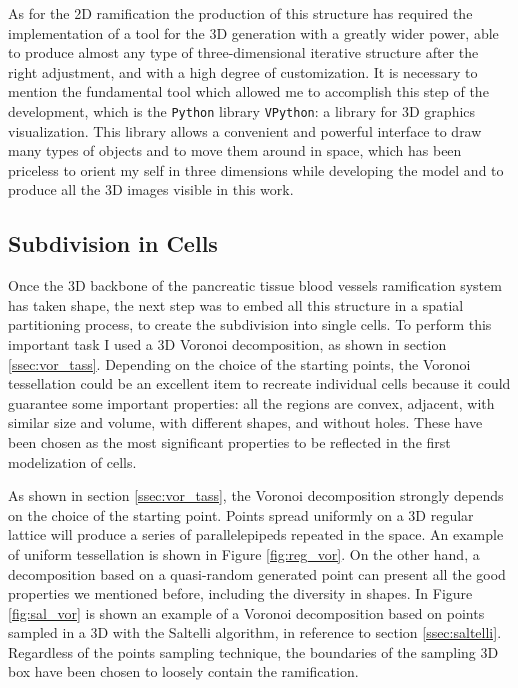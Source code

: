 \documentclass[12pt,a4paper]{report}
\begin{document}
    As for the 2D ramification the production of this structure has required the implementation of a tool for the 3D generation with a greatly wider power, able to produce almost any type of three-dimensional iterative structure after the right adjustment, and with a high degree of customization. It is necessary to mention the fundamental tool which allowed me to accomplish this step of the development, which is the \texttt{Python} library \texttt{VPython}: a library for 3D graphics visualization. This library allows a convenient and powerful interface to draw many types of objects and to move them around in space, which has been priceless to orient my self in three dimensions while developing the model and to produce all the 3D images visible in this work.

\subsection{Subdivision in Cells}
    Once the 3D backbone of the pancreatic tissue blood vessels ramification system has taken shape, the next step was to embed all this structure in a spatial partitioning process, to create the subdivision into single cells. To perform this important task I used a 3D Voronoi decomposition, as shown in section \ref{ssec:vor_tass}. Depending on the choice of the starting points, the Voronoi tessellation could be an excellent item to recreate individual cells because it could guarantee some important properties: all the regions are convex, adjacent, with similar size and volume, with different shapes, and without holes. These have been chosen as the most significant properties to be reflected in the first modelization of cells.

    As shown in section \ref{ssec:vor_tass}, the Voronoi decomposition strongly depends on the choice of the starting point. Points spread uniformly on a 3D regular lattice will produce a series of parallelepipeds repeated in the space. An example of uniform tessellation is shown in Figure \ref{fig:reg_vor}. On the other hand, a decomposition based on a quasi-random generated point can present all the good properties we mentioned before, including the diversity in shapes. In Figure \ref{fig:sal_vor} is shown an example of a Voronoi decomposition based on points sampled in a 3D with the Saltelli algorithm, in reference to section \ref{ssec:saltelli}. Regardless of the points sampling technique, the boundaries of the sampling 3D box have been chosen to loosely contain the ramification.
\end{document}
